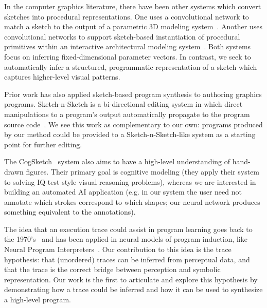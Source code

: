 \documentclass{article}
\begin{document}
In the computer graphics literature, there have been other systems which convert sketches into procedural representations. One uses a convolutional network to match a sketch to the output of a parametric 3D modeling system~\cite{huang2017shape}. Another uses convolutional networks to support sketch-based instantiation of procedural primitives within an interactive architectural modeling system~\cite{Nishida:2016:ISU:2897824.2925951}. Both systems focus on inferring fixed-dimensional parameter vectors. In contrast, we seek to automatically infer a structured, programmatic representation of a sketch which captures higher-level visual patterns.

Prior work has also applied sketch-based program synthesis to authoring graphics programs. Sketch-n-Sketch is a bi-directional editing system in which direct manipulations to a program's output automatically propagate to the program source code~\cite{Hempel:2016:SSP:2984511.2984575}. We see this work as complementary to our own: programs produced by our method could be provided to a Sketch-n-Sketch-like system as a starting point for further editing.

The CogSketch~\cite{forbus2011cogsketch} system also aims to have a
high-level understanding of hand-drawn figures. Their primary goal is
cognitive modeling (they apply their system to solving IQ-test
style visual reasoning problems), whereas we are interested in
building an automated AI application (e.g. in our system the user need
not annotate which strokes correspond to which shapes; our neural
network produces something equivalent to the annotations).

The idea that an execution trace could assist in program learning goes back to the 1970's~\cite{Summers:1977:MLP:321992.322002} and has  been applied in neural models of program induction, like Neural Program Interpreters~\cite{DBLP:journals/corr/ReedF15}.
Our contribution to this idea is the trace hypothesis:
that (unordered) traces can be inferred from perceptual data,
and that the trace is the correct bridge between perception and symbolic representation.
Our work is the first to articulate and explore this hypothesis
by demonstrating how a trace could be inferred and how it can be used to synthesize a high-level program.
\end{document}
